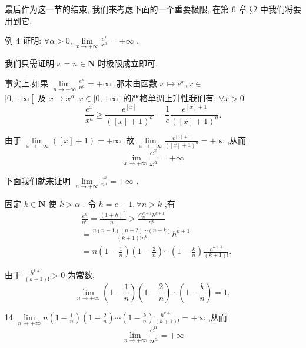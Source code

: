 最后作为这一节的结束, 我们来考虑下面的一个重要极限, 在第 6 章 $§2$ 中我们将要用到它.

例 4 证明: $\forall \alpha  > 0,\mathop{\lim }\limits_{{x \rightarrow   + \infty }}\frac{{e}^{x}}{{x}^{\alpha }} =  + \infty$ .

我们只需证明 $x = n \in  \mathbf{N}$ 时极限成立即可.

事实上,如果 $\mathop{\lim }\limits_{{n \rightarrow   + \infty }}\frac{{e}^{n}}{{n}^{a}} =  + \infty$ ,那末由函数 $x \mapsto  {e}^{x},x \in$  $\rbrack 0, + \infty \left\lbrack  {\text{ 及 }x \mapsto  {x}^{\alpha },x \in  \rbrack 0, + \infty \lbrack }\right.$ 的严格单调上升性我们有: $\forall x > 0$
$$\frac{{e}^{x}}{{x}^{a}} \geq  \frac{{e}^{\left\lbrack  x\right\rbrack  }}{{\left( \left\lbrack  x\right\rbrack   + 1\right) }^{a}} = \frac{1}{e}\frac{{e}^{\left\lbrack  x\right\rbrack   + 1}}{{\left( \left\lbrack  x\right\rbrack   + 1\right) }^{a}}.$$

由于 $\mathop{\lim }\limits_{{x \rightarrow   + \infty }}\left( {\left\lbrack  x\right\rbrack   + 1}\right)  =  + \infty$ ,故 $\mathop{\lim }\limits_{{x \rightarrow   + \infty }}\frac{{e}^{\left\lbrack  x\right\rbrack   + 1}}{{\left( \left\lbrack  x\right\rbrack   + 1\right) }^{a}} =  + \infty$ ,从而
$$\mathop{\lim }\limits_{{x \rightarrow   + \infty }}\frac{{e}^{x}}{{x}^{a}} =  + \infty$$

下面我们就来证明 $\mathop{\lim }\limits_{{n \rightarrow   + \infty }}\frac{{e}^{n}}{{n}^{a}} =  + \infty$ .

固定 $k \in  \mathbf{N}$ 使 $k > \alpha$ . 令 $h = e - 1,\forall n > k$ ,有
\begin{align*}
	&\frac{{e}^{n}}{{n}^{a}} = \frac{{\left( 1 + h\right) }^{n}}{{n}^{a}} > \frac{{C}_{n}^{k + 1}{h}^{k + 1}}{{n}^{k}}\\
	&= \frac{n\left( {n - 1}\right) \left( {n - 2}\right) \cdots \left( {n - k}\right) }{\left( {k + 1}\right) !{n}^{k}}{h}^{k + 1}\\
	&= n\left( {1 - \frac{1}{n}}\right) \left( {1 - \frac{2}{n}}\right) \cdots \left( {1 - \frac{k}{n}}\right) \frac{{h}^{k + 1}}{\left( {k + 1}\right) !}.
\end{align*}

由于 $\frac{{h}^{k + 1}}{\left( {k + 1}\right) !} > 0$ 为常数,
$$\mathop{\lim }\limits_{{n \rightarrow   + \infty }}\left( {1 - \frac{1}{n}}\right) \left( {1 - \frac{2}{n}}\right) \cdots \left( {1 - \frac{k}{n}}\right)  = 1,$$

14 $\mathop{\lim }\limits_{{n \rightarrow   + \infty }}n\left( {1 - \frac{1}{n}}\right) \left( {1 - \frac{2}{n}}\right) \cdots \left( {1 - \frac{k}{n}}\right) \frac{{h}^{k + 1}}{\left( {k + 1}\right) !} =  + \infty$ ,从而
$$\mathop{\lim }\limits_{{n \rightarrow   + \infty }}\frac{{e}^{n}}{{n}^{a}} =  + \infty$$

